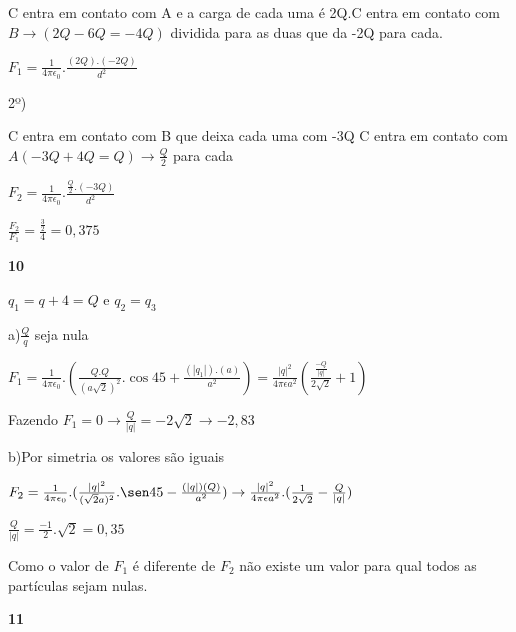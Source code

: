 \documentclass{article}
\begin{document}
C entra em contato com A e a carga de cada uma é 2Q.\newline C entra em contato com $B\rightarrow(2Q - 6Q = -4Q)$ dividida para as duas que da -2Q para cada.\newline

$F_1 = \frac{1}{4\pi\epsilon_0}.\frac{(2Q).(-2Q)}{d^2}$\newline

2º)\newline

C entra em  contato com B que deixa cada uma com -3Q\newline
C entra em contato com $A(-3Q+4Q = Q)\rightarrow\frac{Q}{2}$ para cada\newline

$F_2 = \frac{1}{4\pi\epsilon_0}. \frac{\frac{Q}{2}.(-3Q)}{d^2}$\newline

$\frac{F_2}{F_1} = \frac{\frac{3}{2}}{4} = 0,375$\newline

\textbf{10}\newline

$q_1 =q+4 = Q$ e $q_2 = q_3$\newline

a)$\frac{Q}{q}$ seja nula\newline

$F_1 = \frac{1}{4\pi\epsilon_0}.(\frac{Q.Q}{(a\sqrt{2})^2}.\cos45 + \frac{(|q_1|).(a)}{a^2}) = \frac{|q|^2}{4\pi\epsilon a^2}(\frac{\frac{-Q}{|q|}}{2\sqrt{2}} + 1)$\newline

Fazendo $F_1 = 0 \rightarrow \frac{Q}{|q|} = -2\sqrt{2}\rightarrow -2,83$\newline

b)Por simetria os valores são iguais\newline

$F_2 = \frac{1}{4\pi\epsilon_0}.(\frac{|q|^2}{(\sqrt{2}a)^2}.\sen45 - \frac{(|q|)(Q)}{a^2}) \rightarrow \frac{|q|^2}{4\pi\epsilon a^2}.(\frac{1}{2\sqrt{2}} - \frac{Q}{|q|})$\newline

$\frac{Q}{|q|} = \frac{-1}{2}.\sqrt{2} = 0,35$\newline

Como o valor de $F_1$ é diferente de $F_2$ não existe um valor para qual todos as partículas sejam nulas.\newline

\textbf{11}\newline
\end{document}

